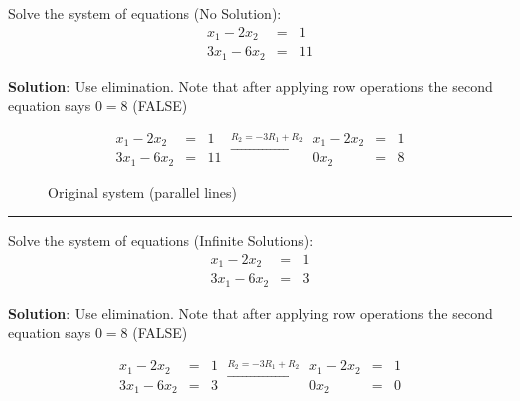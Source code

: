 \begin{example}
Solve the system of equations (No Solution):
\[
\begin{array}{rcl} x_1 - 2x_2 & = & 1 \\ 3x_1 -6 x_2 & = &11 \end{array} 
\]

\textbf{Solution}: Use elimination.   Note that after applying row operations the second equation says $0 = 8$ (FALSE) 

\[  \begin{array}{rcl} x_1 - 2x_2 & = & 1 \\ 3x_1 -6 x_2 & = &11 \end{array}    \xrightarrow[]{R_2 = -3R_1 + R_2}   \begin{array}{rcl} x_1 - 2x_2 & = & 1 \\  0 x_2 & = & 8 \end{array}   \] 
\end{example}

\begin{figure}[h!]
\centering
{}
  \caption{Original system (parallel lines)}
\label{fig:system2}
\end{figure}






\rule[0.01in]{\textwidth}{0.0025in}



\begin{example}
Solve the system of equations (Infinite Solutions):
\[
\begin{array}{rcl} x_1 - 2x_2 & = & 1 \\ 3x_1 -6 x_2 & = &3 \end{array} 
\]

\textbf{Solution}: Use elimination.   Note that after applying row operations the second equation says $0 = 8$ (FALSE) 

\[  \begin{array}{rcl} x_1 - 2x_2 & = & 1 \\ 3x_1 -6 x_2 & = &3 \end{array}    \xrightarrow[]{R_2 = -3R_1 + R_2}   \begin{array}{rcl} x_1 - 2x_2 & = & 1 \\  0 x_2 & = & 0 \end{array}   \] 
\end{example}


